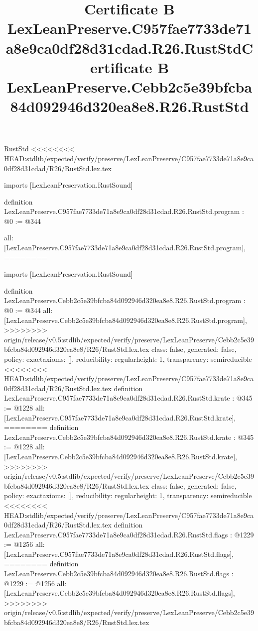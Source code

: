 \begin{lexlean}{RustStd}
<<<<<<<< HEAD:stdlib/expected/verify/preserve/LexLeanPreserve/C957fae7733de71a8e9ca0df28d31cdad/R26/RustStd.lex.tex
\title{Certificate B LexLeanPreserve.C957fae7733de71a8e9ca0df28d31cdad.R26.RustStd}
\begin{coremodule}
imports [LexLeanPreservation.RustSound]

definition LexLeanPreserve.C957fae7733de71a8e9ca0df28d31cdad.R26.RustStd.program : @0 := @344 {
  all: [LexLeanPreserve.C957fae7733de71a8e9ca0df28d31cdad.R26.RustStd.program],
========
\title{Certificate B LexLeanPreserve.Cebb2c5e39bfcba84d092946d320ea8e8.R26.RustStd}
\begin{coremodule}
imports [LexLeanPreservation.RustSound]

definition LexLeanPreserve.Cebb2c5e39bfcba84d092946d320ea8e8.R26.RustStd.program : @0 := @344 {
  all: [LexLeanPreserve.Cebb2c5e39bfcba84d092946d320ea8e8.R26.RustStd.program],
>>>>>>>> origin/release/v0.5:stdlib/expected/verify/preserve/LexLeanPreserve/Cebb2c5e39bfcba84d092946d320ea8e8/R26/RustStd.lex.tex
  class: false,
  generated: false,
  policy: exact{axioms: []},
  reducibility: regular{height: 1},
  transparency: semireducible
}
<<<<<<<< HEAD:stdlib/expected/verify/preserve/LexLeanPreserve/C957fae7733de71a8e9ca0df28d31cdad/R26/RustStd.lex.tex
definition LexLeanPreserve.C957fae7733de71a8e9ca0df28d31cdad.R26.RustStd.krate : @345 := @1228 {
  all: [LexLeanPreserve.C957fae7733de71a8e9ca0df28d31cdad.R26.RustStd.krate],
========
definition LexLeanPreserve.Cebb2c5e39bfcba84d092946d320ea8e8.R26.RustStd.krate : @345 := @1228 {
  all: [LexLeanPreserve.Cebb2c5e39bfcba84d092946d320ea8e8.R26.RustStd.krate],
>>>>>>>> origin/release/v0.5:stdlib/expected/verify/preserve/LexLeanPreserve/Cebb2c5e39bfcba84d092946d320ea8e8/R26/RustStd.lex.tex
  class: false,
  generated: false,
  policy: exact{axioms: []},
  reducibility: regular{height: 1},
  transparency: semireducible
}
<<<<<<<< HEAD:stdlib/expected/verify/preserve/LexLeanPreserve/C957fae7733de71a8e9ca0df28d31cdad/R26/RustStd.lex.tex
definition LexLeanPreserve.C957fae7733de71a8e9ca0df28d31cdad.R26.RustStd.flags : @1229 := @1256 {
  all: [LexLeanPreserve.C957fae7733de71a8e9ca0df28d31cdad.R26.RustStd.flags],
========
definition LexLeanPreserve.Cebb2c5e39bfcba84d092946d320ea8e8.R26.RustStd.flags : @1229 := @1256 {
  all: [LexLeanPreserve.Cebb2c5e39bfcba84d092946d320ea8e8.R26.RustStd.flags],
>>>>>>>> origin/release/v0.5:stdlib/expected/verify/preserve/LexLeanPreserve/Cebb2c5e39bfcba84d092946d320ea8e8/R26/RustStd.lex.tex
}}}
\end{coremodule}}
\end{coremodule}
\end{lexlean}
